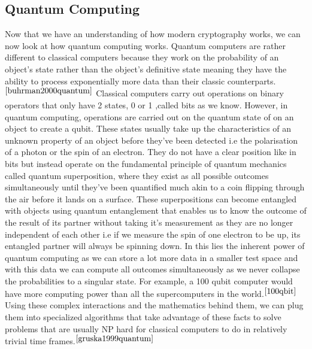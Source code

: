 \documentclass[10pt,a4paper]{IEEEtran}
\begin{document}
\subsection{Quantum Computing}
Now that we have an understanding of how modern cryptography works, we can now look at how quantum computing works. Quantum computers are rather different to classical computers because they work on the probability of an object's state rather than the object's definitive state meaning they have the ability to process exponentially more data than their classic counterparts.\(^{\cite{buhrman2000quantum}}\)
\newline
Classical computers carry out operations on binary operators that only have 2 states, 0 or 1 ,called bits as we know. However, in quantum computing, operations are carried out on the quantum state of on an object to create a qubit. These states usually take up the characteristics of an unknown property of an object before they've been detected i.e the polarisation of a photon or the spin of an electron. They do not have a clear position like in bits but instead operate on the fundamental principle of quantum mechanics called quantum superposition, where they exist as all possible outcomes simultaneously until they've been quantified much akin to a coin flipping through the air before it lands on a surface. 
\newline
These superpositions can become entangled with objects using quantum entanglement that enables us to know the outcome of the result of its partner without taking it's measurement as they are no longer independent of each other i.e if we measure the spin of one electron to be up, its entangled partner will always be spinning down. In this lies the inherent power of quantum computing as we can store a lot more data in a smaller test space and with this data we can compute all outcomes simultaneously as we never collapse the probabilities to a singular state. For example, a 100 qubit computer would have more computing power than all the supercomputers in the world.\(^{\cite{100qbit}}\)
\newline
Using these complex interactions and the mathematics behind them, we can plug them into specialized algorithms that take advantage of these facts to solve problems that are usually NP hard for classical computers to do in relatively trivial time frames.\(^{\cite{gruska1999quantum}}\)
\end{document}

